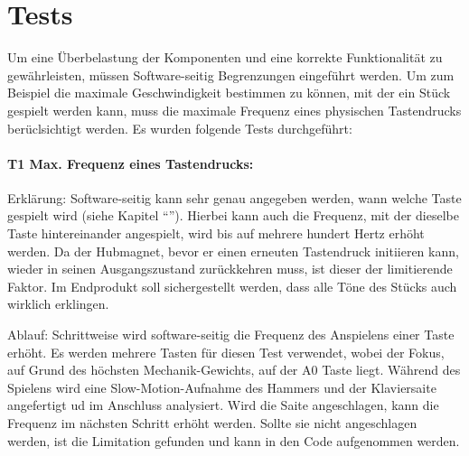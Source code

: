 \chapter{Tests}\label{tests}
\nocite{*}

Um eine Überbelastung der Komponenten und eine korrekte Funktionalität zu gewährleisten, müssen Software-seitig Begrenzungen eingeführt werden.
Um zum Beispiel die maximale Geschwindigkeit bestimmen zu können, mit der ein Stück gespielt werden kann, muss die maximale Frequenz eines physischen Tastendrucks berüclsichtigt werden.
Es wurden folgende Tests durchgeführt:

\subsubsection{T1 Max. Frequenz eines Tastendrucks:}

Erklärung: Software-seitig kann sehr genau angegeben werden, wann welche Taste gespielt wird (siehe Kapitel \enquote{}).
Hierbei kann auch die Frequenz, mit der dieselbe Taste hintereinander angespielt, wird bis auf mehrere hundert Hertz erhöht werden.
Da der Hubmagnet, bevor er einen erneuten Tastendruck initiieren kann, wieder in seinen Ausgangszustand zurückkehren muss, ist dieser der limitierende Faktor.
Im Endprodukt soll sichergestellt werden, dass alle Töne des Stücks auch wirklich erklingen. %

Ablauf: Schrittweise wird software-seitig die Frequenz des Anspielens einer Taste erhöht.
Es werden mehrere Tasten für diesen Test verwendet, wobei der Fokus, auf Grund des höchsten Mechanik-Gewichts, auf der A0 Taste liegt. %
Während des Spielens wird eine Slow-Motion-Aufnahme des Hammers und der Klaviersaite angefertigt ud im Anschluss analysiert.
Wird die Saite angeschlagen, kann die Frequenz im nächsten Schritt erhöht werden.
Sollte sie nicht angeschlagen werden, ist die Limitation gefunden und kann in den Code aufgenommen werden.

